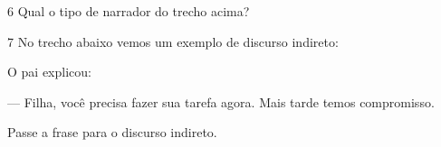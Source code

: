 \num{6} Qual o tipo de narrador do trecho acima?


\pagebreak




\num{7} No trecho abaixo vemos um exemplo de discurso indireto:

\begin{myquote}

O pai explicou: 

--- Filha, você precisa fazer sua tarefa agora. Mais tarde
temos compromisso.

\end{myquote}

Passe a frase para o discurso indireto.

